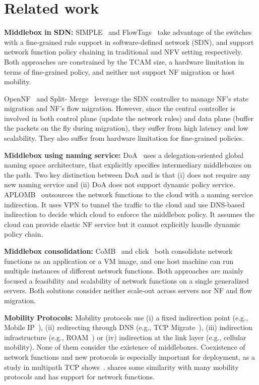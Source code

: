 \section{Related work}

\textbf{Middlebox in SDN:}
SIMPLE~\cite{SIMPLE} and FlowTags~\cite{FLOWTAGS} take advantage of the switches with a fine-grained rule support in software-defined network (SDN), and support network function policy chaining in traditional and NFV setting respectively. Both approaches are constrained by the TCAM size, a hardware limitation in terms of fine-grained policy, and neither not support NF migration or host mobility. 

OpenNF~\cite{OpenNF} and Split- Merge~\cite{splitmerge} leverage the SDN controller to manage NF's state migration and NF's flow migration. However, since the central controller is involved in both control plane (update the network rules) and data plane (buffer the packets on the fly during migration), they suffer from high latency and low scalability. They also suffer from hardware limitation for fine-grained policies.  

\textbf{Middlebox using naming service:}
DoA~\cite{DOA} uses a delegation-oriented global naming space architecture, that explicitly specifies intermediary middleboxes on the path. Two key distinction between DoA and \system is that (i) \system does not require any new naming service and (ii) DoA does not support dynamic policy service. APLOMB~\cite{Aplomb} outsources the network functions to the cloud with a naming service indirection. It uses VPN to tunnel the traffic to the cloud and use DNS-based indirection to decide which cloud to enforce the middlebox policy. It assumes the cloud can provide elastic NF service but it cannot explicitly handle dynamic policy chain. 


\textbf{Middlebox consolidation:}
CoMB~\cite{COMB} and click~\cite{ClickOS, click} both consolidate network functions as an application or a VM image, and one host machine can run multiple instances of different network functions. Both approaches are mainly focused a feasibility and scalability of network functions on a single generalized servers. Both solutions consider neither scale-out across servers nor NF and flow migration.

\textbf{Mobility Protocols:}
Mobility protocols use (i) a fixed indirection point (e.g., Mobile IP~\cite{mip}), (ii) redirecting through DNS (e.g., TCP Migrate~\cite{TCPMobile}), (iii) indirection infrastructure (e.g., ROAM~\cite{I3Mobile}) or (iv) indirection at the link layer (e.g., cellular mobility). None of them consider the existence of middleboxes. Coexistence of network functions and new protocols is especially important for deployment, as a study in multipath TCP shows~\cite{MPTCP}. \system shares some similarity with many mobility protocols and has support for network functions.   
